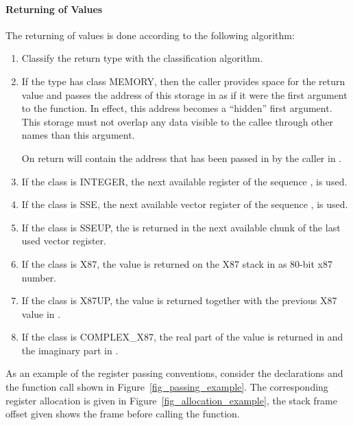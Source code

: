 \paragraph{Returning of Values}
The returning of values is done according to the following algorithm:
\begin{enumerate}
\item Classify the return type with the classification algorithm.

\item If the type has class MEMORY, then the caller provides space for
   the return value and passes the address of this storage in \RDI as
   if it were the first argument to the function.  In effect, this
   address becomes a ``hidden'' first argument.  This storage must
   not overlap any data visible to the callee through other names
   than this argument.

   On return \RAX will contain the address that has been passed in by
   the caller in \RDI.

\item If the class is INTEGER, the next available register of the
   sequence \RAX, \RDX is used.

\item If the class is SSE, the next available vector register of the
   sequence ,  is used.

\item If the class is SSEUP, the \eightbyte is returned in the next
   available \eightbyte chunk of the last used vector register.

\item If the class is X87, the value is returned on the X87 stack in
    as 80-bit x87 number.

\item If the class is X87UP, the value is returned together with the
   previous X87 value in .
\item If the class is COMPLEX\_X87, the real part of the value is
  returned in  and the imaginary part in .
\end{enumerate}

As an example of the register passing conventions, consider the
declarations and the function call shown in
Figure~\ref{fig_passing_example}.  The corresponding register
allocation is given in Figure~\ref{fig_allocation_example}, the stack
frame offset given shows the frame before calling the function.

